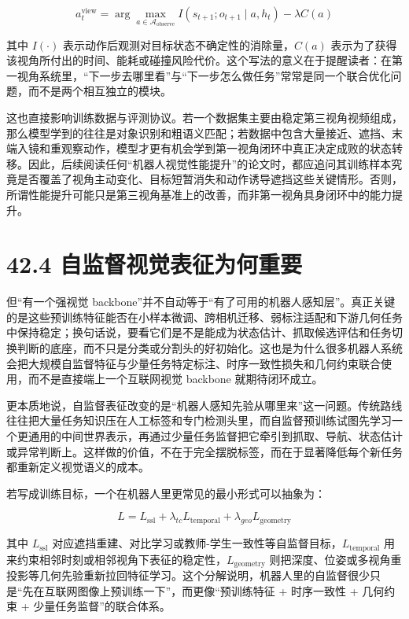 \begingroup
\scriptsize
\begin{equation*}
a_t^{\text{view}}
=
\arg\max_{a \in \mathcal{A}_{\text{observe}}}
I(s_{t+1}; o_{t+1}\mid a, h_t)-\lambda C(a)
\end{equation*}
\endgroup

其中 \(I(\cdot)\) 表示动作后观测对目标状态不确定性的消除量，\(C(a)\) 表示为了获得该视角所付出的时间、能耗或碰撞风险代价。这个写法的意义在于提醒读者：在第一视角系统里，“下一步去哪里看”与“下一步怎么做任务”常常是同一个联合优化问题，而不是两个相互独立的模块。

这也直接影响训练数据与评测协议。若一个数据集主要由稳定第三视角视频组成，那么模型学到的往往是对象识别和粗语义匹配；若数据中包含大量接近、遮挡、末端入镜和重观察动作，模型才更有机会学到第一视角闭环中真正决定成败的状态转移。因此，后续阅读任何“机器人视觉性能提升”的论文时，都应追问其训练样本究竟是否覆盖了视角主动变化、目标短暂消失和动作诱导遮挡这些关键情形。否则，所谓性能提升可能只是第三视角基准上的改善，而非第一视角具身闭环中的能力提升。

\section*{42.4 自监督视觉表征为何重要}


但“有一个强视觉 backbone”并不自动等于“有了可用的机器人感知层”。真正关键的是这些预训练特征能否在小样本微调、跨相机迁移、弱标注适配和下游几何任务中保持稳定；换句话说，要看它们是不是能成为状态估计、抓取候选评估和任务切换判断的底座，而不只是分类或分割头的好初始化。这也是为什么很多机器人系统会把大规模自监督特征与少量任务特定标注、时序一致性损失和几何约束联合使用，而不是直接端上一个互联网视觉 backbone 就期待闭环成立。

更本质地说，自监督表征改变的是“机器人感知先验从哪里来”这一问题。传统路线往往把大量任务知识压在人工标签和专门检测头里，而自监督预训练试图先学习一个更通用的中间世界表示，再通过少量任务监督把它牵引到抓取、导航、状态估计或异常判断上。这样做的价值，不在于完全摆脱标签，而在于显著降低每个新任务都重新定义视觉语义的成本。

若写成训练目标，一个在机器人里更常见的最小形式可以抽象为：

\begingroup
\scriptsize
\begin{equation*}
L = L_{\mathrm{ssl}} + \lambda_{tc} L_{\mathrm{temporal}} + \lambda_{geo} L_{\mathrm{geometry}}
\end{equation*}
\endgroup

其中 \(L_{\mathrm{ssl}}\) 对应遮挡重建、对比学习或教师-学生一致性等自监督目标，\(L_{\mathrm{temporal}}\) 用来约束相邻时刻或相邻视角下表征的稳定性，\(L_{\mathrm{geometry}}\) 则把深度、位姿或多视角重投影等几何先验重新拉回特征学习。这个分解说明，机器人里的自监督很少只是“先在互联网图像上预训练一下”，而更像“预训练特征 + 时序一致性 + 几何约束 + 少量任务监督”的联合体系。

